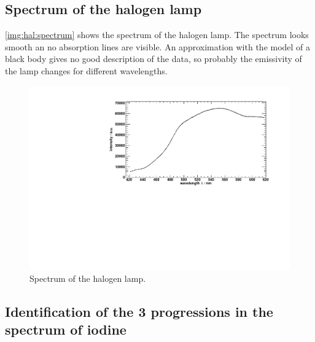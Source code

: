 \subsection{Spectrum of the halogen lamp}

\autoref{img:hal:spectrum} shows the spectrum of the halogen lamp.
The spectrum looks smooth an no absorption lines are visible.
An approximation with the model of a black body gives no good description of the data,
so probably the emissivity of the lamp changes for different wavelengths. 



\begin{figure}[H]
\begin{center}
  \includegraphics[width=\textwidth]{../img/halogen_lamp.pdf}
  \caption[---]{Spectrum of the halogen lamp.}
  \label{img:hal:spectrum}
\end{center}
\end{figure}




\subsection{Identification of the 3 progressions in the spectrum of iodine}

